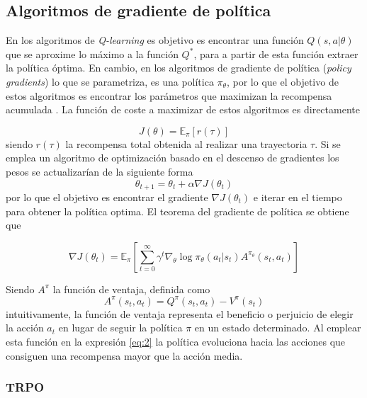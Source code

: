 \subsection{Algoritmos de gradiente de política} \label{ALG_GRAD_POL}

En los algoritmos de \textit{Q-learning} es objetivo es encontrar una función $Q(s,a|\theta)$ que se aproxime lo máximo a la función $Q^*$, para a partir de esta función extraer la política óptima.
En cambio, en los algoritmos de gradiente de política (\textit{policy gradients}) lo que se parametriza, es una política $\pi_\theta$, por lo que el objetivo  de estos algoritmos es encontrar los parámetros que maximizan la recompensa acumulada . La función de coste a maximizar de estos algoritmos es directamente

\begin{equation}
J(\theta)=\mathbb{E}_\pi[r(\tau)]	
\end{equation}
siendo $r(\tau)$ la recompensa total obtenida al realizar una trayectoria $\tau$. Si se emplea un algoritmo de optimización basado en el descenso de gradientes los pesos se actualizarían de la siguiente forma
\begin{equation}
	\theta_{t+1} = \theta_t + \alpha \nabla J (\theta_t)
\end{equation}
por lo que el objetivo es encontrar el gradiente $\nabla J (\theta_t)$ e iterar en el tiempo para obtener la política optima. El teorema del gradiente de política  \cite{silver2014deterministic} se obtiene que 

\begin{equation}\label{eq:2}
	\nabla J (\theta_t) = \mathbb{E}_\pi\left[\sum_{t=0}^{\infty}\gamma^t  \nabla_\theta \log \pi_\theta(a_t|s_t) A^{\pi_\theta}(s_t,a_t)\right]
\end{equation} 

	Siendo $A^\pi$ la función de ventaja, definida como 
	\begin{equation}
	A^\pi(s_t,a_t)=Q^\pi(s_t,a_t) - V^\pi(s_t)
	\end{equation}
intuitivamente, la función de ventaja representa el beneficio o perjuicio de elegir la acción $a_t$ en lugar de seguir la política $\pi$ en un estado determinado. Al emplear esta función en la expresión \ref{eq:2} la política evoluciona hacia las acciones que consiguen una recompensa mayor que la acción media.

\subsubsection{TRPO}

